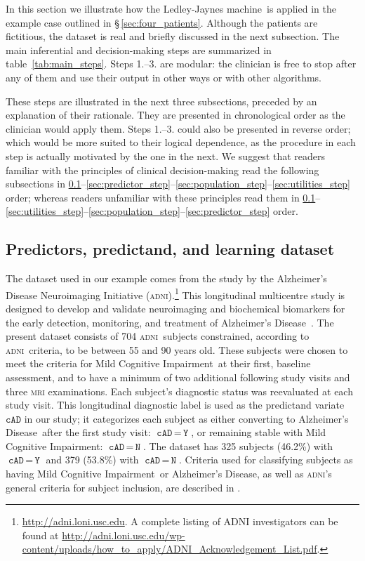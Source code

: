 \documentclass[utf8]{FrontiersinHarvard_mod} %
\newcommand*{\mo}[1][=]{\mathord{\,#1\,}}
\newcommand*{\sect}{\S}%
\renewcommand*{\|}[1][]{\nonscript\:#1\vert\nonscript\:\mathopen{}}
\newcommand*{\cad}{\texttt{cAD}}
\newcommand*{\yes}{\texttt{Y}}
\newcommand*{\no}{\texttt{N}}
\newcommand*{\ad}{Alzheimer's Disease}
\newcommand*{\mci}{Mild Cognitive Impairment}
\newcommand*{\ljm}{Ledley-Jaynes machine}
\newcommand*{\adni}{\textsc{adni}}
\begin{document}
In this section we illustrate how the \ljm\ is applied in the example case outlined in \sect\,\ref{sec:four_patients}. Although the patients are fictitious, the dataset is real and briefly discussed in the next subsection. The main inferential and decision-making steps are summarized in table~\ref{tab:main_steps}.
Steps 1.--3. are modular: the clinician is free to stop after any of them and use their output in other ways or with other algorithms.


These steps are illustrated in the next three subsections, preceded by an explanation of their rationale. They are presented in chronological order as the clinician would apply them. %
Steps 1.--3. could also be presented in reverse order; which would be more suited to their logical dependence, as the procedure in each step is actually motivated by the one in the next. We suggest that readers familiar with the principles of clinical decision-making read the following subsections in \ref{sec:dataset}--\ref{sec:predictor_step}--\ref{sec:population_step}--\ref{sec:utilities_step} order; whereas readers unfamiliar with these principles read them in \ref{sec:dataset}--\ref{sec:utilities_step}--\ref{sec:population_step}--\ref{sec:predictor_step} order.


\setcounter{subsection}{-1}
\subsection{Predictors, predictand, and learning dataset}
\label{sec:dataset}

The dataset used in our example comes from the study by the Alzheimer's Disease Neuroimaging Initiative (\adni).\footnote{\url{http://adni.loni.usc.edu}. A complete listing of ADNI investigators can be found at \url{http://adni.loni.usc.edu/wp-content/uploads/how\_to\_apply/ADNI\_Acknowledgement\_List.pdf}.} This longitudinal multicentre study is designed to develop and validate neuroimaging and biochemical biomarkers for the early detection, monitoring, and treatment of \ad\ \citep{petersenetal2010}. The present dataset consists of 704 \adni\ subjects constrained, according to \adni\ criteria, to be between 55 and 90 years old. These subjects were chosen to meet the criteria for \mci\ at their first, baseline assessment, and to have a minimum of two additional following study visits and three \textsc{mri} examinations. Each subject's diagnostic status was reevaluated at each study visit. This longitudinal diagnostic label is used as the predictand variate $\cad$ in our study; it categorizes each subject as either converting to \ad\ after the first study visit: $\cad\mo\yes$, or remaining stable with \mci: $\cad\mo\no$. The dataset has 325 subjects (46.2\%) with $\cad\mo\yes$ and 379 (53.8\%) with $\cad\mo\no$. Criteria used for classifying subjects as having \mci\ or \ad, as well as \adni's general criteria for subject inclusion, are described in \citet{mckhannetal1984,petersenetal2010}.
\end{document}
